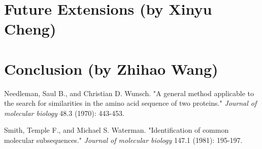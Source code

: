 \documentclass[12pt]{article}
\begin{document}
\section{Future Extensions (by Xinyu Cheng)}

\section{Conclusion (by Zhihao Wang)}

\newpage
\begin{thebibliography}{9}

Needleman, Saul B., and Christian D. Wunsch. "A general method applicable to the search for similarities in the amino acid sequence of two proteins." \textit{Journal of molecular biology} 48.3 (1970): 443-453.

Smith, Temple F., and Michael S. Waterman. "Identification of common molecular subsequences." \textit{Journal of molecular biology} 147.1 (1981): 195-197.


\end{thebibliography}
\end{document}
